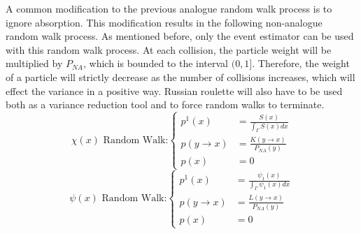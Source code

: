 A common modification to the previous analogue random walk process is to 
ignore absorption. This modification results in the following non-analogue
random walk process. As mentioned before, only the event estimator can be used
with this random walk process. At each collision, the particle weight will be
multiplied by $P_{NA}$, which is bounded to the interval $(0,1]$. Therefore,
the weight of a particle will strictly decrease as the number of collisions
increases, which will effect the variance in a positive way. Russian roulette
will also have to be used both as a variance reduction tool and to force random
walks to terminate.
\begin{equation}
  \chi(x)\text{ Random Walk:}
  \begin{cases}
    p^1(x) & = \frac{S(x)}{\int_{\Gamma} S(x)dx} \\
    p(y \to x) &  = \frac{K(y \to x)}{P_{NA}(y)} \\
    p(x) & = 0
  \end{cases}
  \label{eq:mc_random_walk_emission_dens_nonan}
\end{equation}
\begin{equation}
  \psi(x)\text{ Random Walk:}
  \begin{cases}
    p^1(x) & = \frac{\psi_1(x)}{\int_{\Gamma}\psi_1(x)dx} \\
    p(y \to x) & = \frac{L(y \to x)}{P_{NA}(y)} \\
    p(x) & = 0
  \end{cases}
  \label{eq:mc_random_walk_collision_dens_nonan}
\end{equation}


